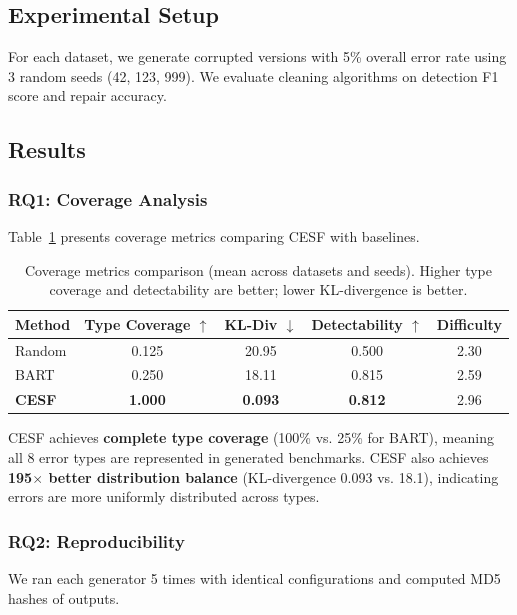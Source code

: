 \documentclass[11pt,a4paper]{article}
\begin{document}
\subsection{Experimental Setup}

For each dataset, we generate corrupted versions with 5\% overall error rate using 3 random seeds (42, 123, 999). We evaluate cleaning algorithms on detection F1 score and repair accuracy.

\subsection{Results}

\subsubsection{RQ1: Coverage Analysis}

Table~\ref{tab:coverage} presents coverage metrics comparing CESF with baselines.

\begin{table}[t]
\caption{Coverage metrics comparison (mean across datasets and seeds). Higher type coverage and detectability are better; lower KL-divergence is better.}
\label{tab:coverage}
\centering
\begin{tabular}{lcccc}
\toprule
Method & Type Coverage $\uparrow$ & KL-Div $\downarrow$ & Detectability $\uparrow$ & Difficulty \\
\midrule
Random & 0.125 & 20.95 & 0.500 & 2.30 \\
BART & 0.250 & 18.11 & 0.815 & 2.59 \\
\textbf{CESF} & \textbf{1.000} & \textbf{0.093} & \textbf{0.812} & 2.96 \\
\bottomrule
\end{tabular}
\end{table}

CESF achieves \textbf{complete type coverage} (100\% vs. 25\% for BART), meaning all 8 error types are represented in generated benchmarks. CESF also achieves \textbf{195$\times$ better distribution balance} (KL-divergence 0.093 vs. 18.1), indicating errors are more uniformly distributed across types.

\subsubsection{RQ2: Reproducibility}

We ran each generator 5 times with identical configurations and computed MD5 hashes of outputs.
\end{document}
